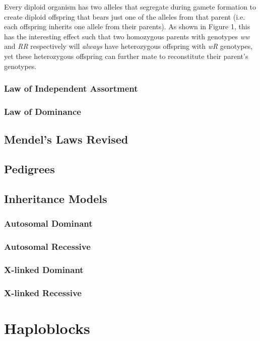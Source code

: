 Every diploid organism has two alleles that segregate during gamete formation to create diploid offspring that bears just one of the alleles from that parent (i.e. each offspring inherits one allele from their parents). As shown in Figure 1, this has the interesting effect such that two homozygous parents with genotypes \textit{ww} and \textit{RR} respectively will \textit{always} have heterozygous offspring with \textit{wR} genotypes, yet these heterozygous offspring can further mate to reconstitute their parent's genotypes.

\subsubsection{Law of Independent Assortment}
\subsubsection{Law of Dominance}

\subsection{Mendel's Laws Revised}
\subsection{Pedigrees}

\subsection{Inheritance Models}
\subsubsection{Autosomal Dominant}
\subsubsection{Autosomal Recessive}
\subsubsection{X-linked Dominant}
\subsubsection{X-linked Recessive}

\section{Haploblocks}

